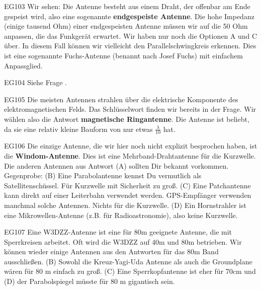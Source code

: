 \begin{sol}{EG103}
 Wir sehen: Die Antenne besteht aus einem Draht, der offenbar am Ende gespeist wird, also eine sogenannte \textbf{endgespeiste Antenne}.
 Die hohe Impedanz (einige tausend Ohm) einer endgespeisten Antenne müssen wir auf die 50 Ohm anpassen, die das Funkgerät erwartet. Wir haben nur noch die Optionen A und C über.
 In diesem Fall können wir vielleicht den Parallelschwingkreis erkennen. Dies ist eine sogenannte Fuchs-Antenne (benannt nach Josef Fuchs) mit einfachem Anpassglied.
\end{sol}

\begin{sol}{EG104}
    Siehe Frage .
\end{sol}


\begin{sol}{EG105}
    Die meisten Antennen strahlen über die elektrische Komponente des elektromagnetischen Felds.
    Das Schlüsselwort  finden wir bereits in der Frage. Wir wählen also die Antwort \textbf{magnetische Ringantenne}. Die Antenne ist beliebt, da sie eine relativ kleine Bauform von nur etwas $\frac{\lambda}{10}$ hat.
\end{sol}

\begin{sol}{EG106}
 Die einzige Antenne, die wir hier noch nicht explizit besprochen haben, ist die \textbf{Windom-Antenne}. Dies ist eine Mehrband-Drahtantenne für die Kurzwelle. 
Die anderen Antennen aus Antwort (A) sollten Dir bekannt vorkommen.
Gegenprobe: (B) Eine Parabolantenne kennst Du vermutlich als Satellitenschüssel. Für Kurzwelle mit Sicherheit zu groß.
(C) Eine Patchantenne kann direkt auf einer Leiterbahn verwendet werden. GPS-Empfänger verwenden manchmal solche Antennen. Nichts für die Kurzwelle.
(D) Ein Hornstrahler ist eine Mikrowellen-Antenne (z.B. für Radioastronomie), also keine Kurzwelle.
\end{sol}

\begin{sol}{EG107}
    Eine W3DZZ-Antenne ist eine für 80m geeignete Antenne, die mit Sperrkreisen arbeitet. Oft wird die W3DZZ auf 40m und 80m betrieben.
Wir können wieder einige Antennen aus den Antworten für das 80m Band ausschließen.
(B) Sowohl die Kreuz-Yagi-Uda Antenne als auch die Groundplane wären für 80 m einfach zu groß.
(C) Eine Sperrkopfantenne ist eher für 70cm und (D) der Parabolspiegel müsste für 80 m gigantisch sein.
\end{sol}


